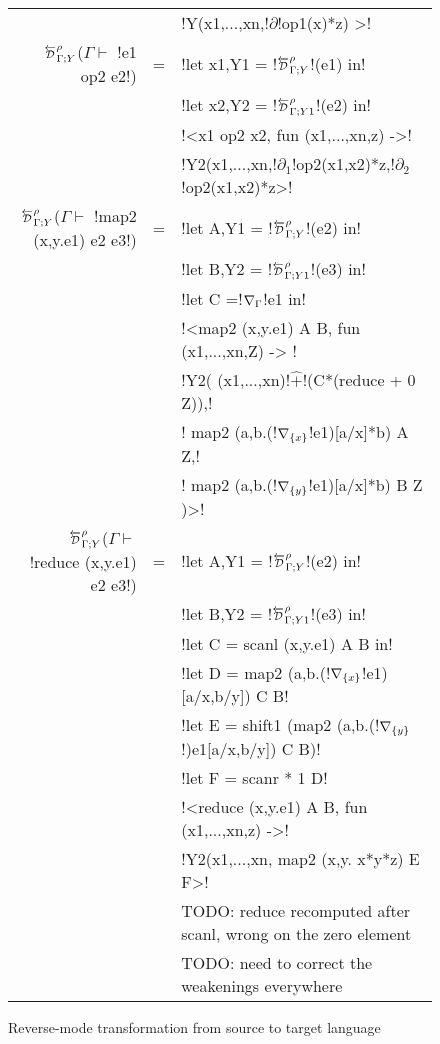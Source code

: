 \begin{figure*}[t]
\begin{tabular}{r c l}
            && !Y(x1,...,xn,!$\partial$!op1(x)*z) >! \\
        $\directD{\rho}{\Gamma}{Y}$($\Gamma\vdash $ !e1 op2 e2!) &=& 
            !let x1,Y1 = !$\directD{\rho}{\Gamma}{Y}$!(e1) in! \\
            && !let x2,Y2 = !$\directD{\rho}{\Gamma}{Y1}$!(e2) in! \\
            && !<x1 op2 x2, fun (x1,...,xn,z) ->! \\
            && !Y2(x1,...,xn,!$\partial_1$!op2(x1,x2)*z,!$\partial_2$!op2(x1,x2)*z>! \\
        $\directD{\rho}{\Gamma}{Y}$($\Gamma\vdash $ !map2 (x,y.e1) e2 e3!) &=&  
            !let A,Y1 = !$\directD{\rho}{\Gamma}{Y}$!(e2) in! \\
            && !let B,Y2 = !$\directD{\rho}{\Gamma}{Y1}$!(e3) in! \\
            && !let C =!$\nabla_{\Gamma}$!e1 in!\\
            && !<map2 (x,y.e1) A B, fun (x1,...,xn,Z) -> !\\
            && !Y2( (x1,...,xn)!$\widehat{+}$!(C*(reduce + 0 Z)),!\\
            && \quad\quad! map2 (a,b.(!$\nabla_{\{x\}}$!e1)[a/x]*b) A Z,!\\
            && \quad\quad! map2 (a,b.(!$\nabla_{\{y\}}$!e1)[a/x]*b) B Z )>!\\
        $\directD{\rho}{\Gamma}{Y}$($\Gamma\vdash $ !reduce (x,y.e1) e2 e3!) &=&
            !let A,Y1 = !$\directD{\rho}{\Gamma}{Y}$!(e2) in! \\
            && !let B,Y2 = !$\directD{\rho}{\Gamma}{Y1}$!(e3) in! \\
            && !let C = scanl (x,y.e1) A B in! \\
            && !let D = map2 (a,b.(!$\nabla_{\{x\}}$!e1)[a/x,b/y]) C B! \\
            && !let E = shift1 (map2 (a,b.(!$\nabla_{\{y\}}$!)e1[a/x,b/y]) C B)! \\
            && !let F = scanr * 1 D! \\
            && !<reduce (x,y.e1) A B, fun (x1,...,xn,z) ->! \\
            && !Y2(x1,...,xn, map2 (x,y. x*y*z) E F>! \\
            && TODO: reduce recomputed after scanl, wrong on the zero element \\
            && TODO: need to correct the weakenings everywhere
        \end{tabular}
    \caption{Reverse-mode transformation from source to target language}
    \label{fig:direct_diff_macro}    
\end{figure*}